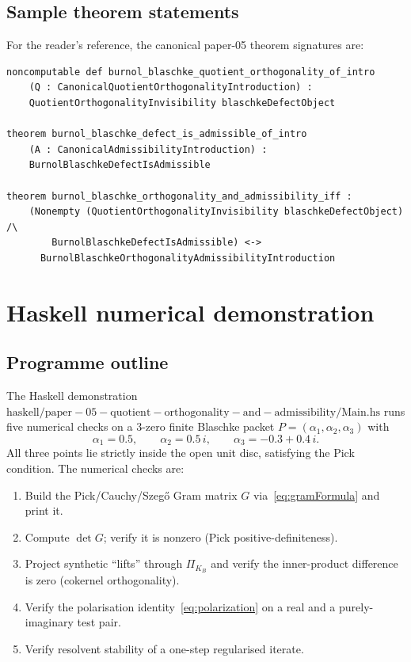 \documentclass[12pt]{article}
\theoremstyle{definition}
\theoremstyle{remark}
\newcommand{\KB}{K_{B}}
\newcommand{\PK}{\Pi_{\KB}}
\begin{document}
\subsection{Sample theorem statements}

For the reader's reference, the canonical paper-05 theorem signatures are:
\begin{verbatim}
noncomputable def burnol_blaschke_quotient_orthogonality_of_intro
    (Q : CanonicalQuotientOrthogonalityIntroduction) :
    QuotientOrthogonalityInvisibility blaschkeDefectObject

theorem burnol_blaschke_defect_is_admissible_of_intro
    (A : CanonicalAdmissibilityIntroduction) :
    BurnolBlaschkeDefectIsAdmissible

theorem burnol_blaschke_orthogonality_and_admissibility_iff :
    (Nonempty (QuotientOrthogonalityInvisibility blaschkeDefectObject) /\
        BurnolBlaschkeDefectIsAdmissible) <->
      BurnolBlaschkeOrthogonalityAdmissibilityIntroduction
\end{verbatim}

\section{Haskell numerical demonstration}\label{sec:haskell}

\subsection{Programme outline}

The Haskell demonstration $\mathrm{haskell/paper-05-quotient-orthogonality-and-admissibility/Main.hs}$ runs five numerical checks on a 3-zero finite Blaschke packet $P = (\alpha_{1}, \alpha_{2}, \alpha_{3})$ with
\begin{equation}\label{eq:demoPacket}
  \alpha_{1} = 0.5,\qquad \alpha_{2} = 0.5\,i,\qquad \alpha_{3} = -0.3 + 0.4\,i.
\end{equation}
All three points lie strictly inside the open unit disc, satisfying the Pick condition. The numerical checks are:
\begin{enumerate}
  \item Build the Pick/Cauchy/Szeg\H{o} Gram matrix $G$ via~\eqref{eq:gramFormula} and print it.
  \item Compute $\det G$; verify it is nonzero (Pick positive-definiteness).
  \item Project synthetic ``lifts'' through $\PK$ and verify the inner-product difference is zero (cokernel orthogonality).
  \item Verify the polarisation identity~\eqref{eq:polarization} on a real and a purely-imaginary test pair.
  \item Verify resolvent stability of a one-step regularised iterate.
\end{enumerate}
\end{document}
